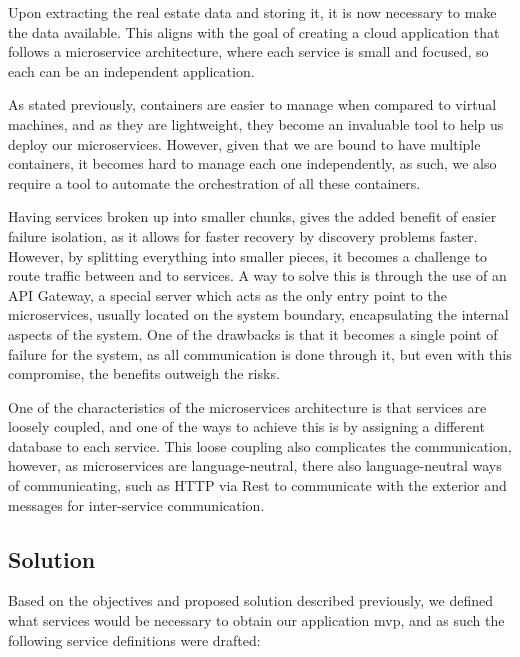 
Upon extracting the real estate data and storing it, it is now necessary to make the data available. This aligns with the goal of creating a cloud application that follows a microservice architecture, where each service is small and focused, so each can be an independent application.

As stated previously, containers are easier to manage when compared to virtual machines, and as they are lightweight, they become an invaluable tool to help us deploy our microservices. However, given that we are bound to have multiple containers, it becomes hard to manage each one independently, as such, we also require a tool to automate the orchestration of all these containers.

Having services broken up into smaller chunks, gives the added benefit of easier failure isolation, as it allows for faster recovery by discovery problems faster. However, by splitting everything into smaller pieces, it becomes a challenge to route traffic between and to services. A way to solve this is through the use of an API Gateway, a special server which acts as the only entry point to the microservices, usually located on the system boundary, encapsulating the internal aspects of the system. One of the drawbacks is that it becomes a single point of failure for the system, as all communication is done through it, but even with this compromise, the benefits outweigh the risks.

One of the characteristics of the microservices architecture is that services are loosely coupled, and one of the ways to achieve this is by assigning a different database to each service. This loose coupling also complicates the communication, however, as microservices are language-neutral, there also language-neutral ways of communicating, such as HTTP via Rest to communicate with the exterior and messages for inter-service communication. 

\subsection{Solution}
\label{ss:backend-solution}

Based on the objectives and proposed solution described previously, we defined what services would be necessary to obtain our application \acrfull{mvp}, and as such the following service definitions were drafted:

